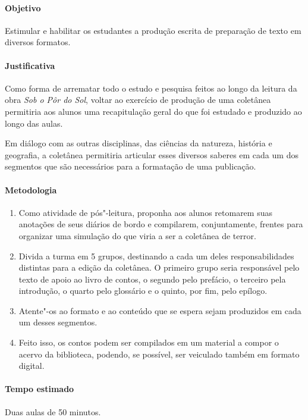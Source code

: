 \documentclass[12pt]{extarticle}
\begin{document}
\paragraph{Objetivo} Estimular e habilitar os estudantes a produção escrita de preparação de 
texto em diversos formatos. 

\paragraph{Justificativa} Como forma de arrematar todo o estudo e pesquisa feitos ao longo da 
leitura da obra \emph{Sob o Pôr do Sol}, voltar ao exercício de produção de uma coletânea permitiria 
aos alunos uma recapitulação geral do que foi estudado e produzido ao longo das aulas. 

Em diálogo com as outras disciplinas, das ciências da natureza, história e geografia, a coletânea permitiria
articular esses diversos saberes em cada um dos segmentos que são necessários para a formatação de uma 
publicação. 

\paragraph{Metodologia}

\begin{enumerate}
\item
Como atividade de pós"-leitura, proponha aos alunos retomarem suas anotações de seus diários 
de bordo e compilarem, conjuntamente, frentes para organizar uma simulação do que viria a ser 
a coletânea de terror. 

\item
Divida a turma em 5 grupos, destinando a cada um deles responsabilidades distintas para a edição da 
coletânea. O primeiro grupo seria responsável pelo texto de apoio ao livro de contos, o segundo pelo 
prefácio, o terceiro pela introdução, o quarto pelo glossário e o quinto, por fim, pelo epílogo. 

\item
Atente"-os ao formato e ao conteúdo que se espera sejam
produzidos em cada um desses segmentos. 

\item
Feito isso, os contos podem ser compilados em um material a compor o acervo da biblioteca, podendo, se 
possível, ser veiculado também em formato digital. 

\end{enumerate}

\paragraph{Tempo estimado} Duas aulas de 50 minutos.
\end{document}

